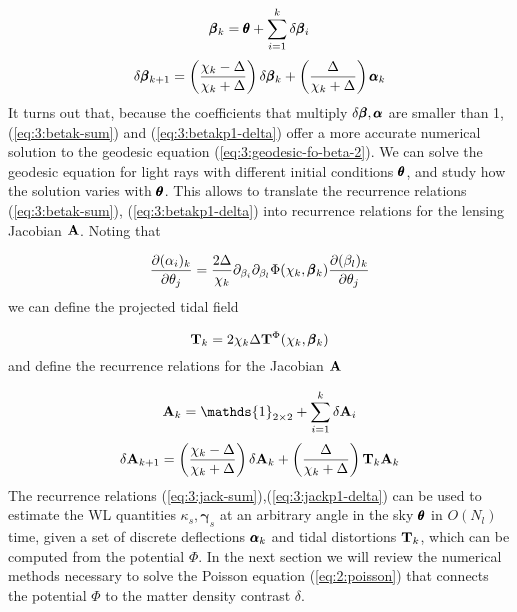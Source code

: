 \begin{equation}
\label{eq:3:betak-sum}
\pmb{\beta}_k = \pmb{\theta} + \sum_{i=1}^k\delta\pmb{\beta}_i
\end{equation}
%
\begin{equation}
\label{eq:3:betakp1-delta}
\delta\pmb{\beta}_{k+1} = \left(\frac{\chi_k-\Delta}{\chi_k+\Delta}\right)\delta\pmb{\beta}_k + \left(\frac{\Delta}{\chi_k+\Delta}\right)\pmb{\alpha}_k
\end{equation} 
%
It turns out that, because the coefficients that multiply $\delta\pmb{\beta},\pmb{\alpha}$ are smaller than 1, (\ref{eq:3:betak-sum}) and (\ref{eq:3:betakp1-delta}) offer a more accurate numerical solution to the geodesic equation (\ref{eq:3:geodesic-fo-beta-2}). We can solve the geodesic equation for light rays with different initial conditions $\pmb{\theta}$, and study how the solution varies with $\pmb{\theta}$. This allows to translate the recurrence relations (\ref{eq:3:betak-sum}), (\ref{eq:3:betakp1-delta}) into recurrence relations for the lensing Jacobian $\mathbf{A}$. Noting that 

\begin{equation}
\label{eq:3:Tk}
\frac{\partial (\alpha_i)_k}{\partial \theta_j} = \frac{2\Delta}{\chi_k}\partial_{\beta_i}\partial_{\beta_l}\Phi(\chi_k,\pmb{\beta}_k)\frac{\partial (\beta_l)_k}{\partial\theta_j}
\end{equation}
%
we can define the projected tidal field 

\begin{equation}
\label{eq:3:tidal-proj}
\mathbf{T}_k = 2\chi_k\Delta\mathbf{T}^\Phi(\chi_k,\pmb{\beta}_k) 
\end{equation}
%
and define the recurrence relations for the Jacobian $\mathbf{A}$

\begin{equation}
\label{eq:3:jack-sum}
\bb{A}_k = \mathds{1}_{2\times 2} + \sum_{i=1}^k\delta\bb{A}_i
\end{equation}
%
\begin{equation}
\label{eq:3:jackp1-delta}
\delta\mathbf{A}_{k+1} = \left(\frac{\chi_k-\Delta}{\chi_k+\Delta}\right)\delta\mathbf{A}_k + \left(\frac{\Delta}{\chi_k+\Delta}\right)\mathbf{T}_k\mathbf{A}_k
\end{equation} 
%
The recurrence relations (\ref{eq:3:jack-sum}),(\ref{eq:3:jackp1-delta}) can be used to estimate the WL quantities $\kappa_s,\pmb{\gamma}_s$ at an arbitrary angle in the sky $\pmb{\theta}$ in $O(N_l)$ time, given a set of discrete deflections $\pmb{\alpha}_k$ and tidal distortions $\mathbf{T}_k$, which can be computed from the potential $\Phi$. In the next section we will review the numerical methods necessary to solve the Poisson equation (\ref{eq:2:poisson}) that connects the potential $\Phi$ to the matter density contrast $\delta$. 

